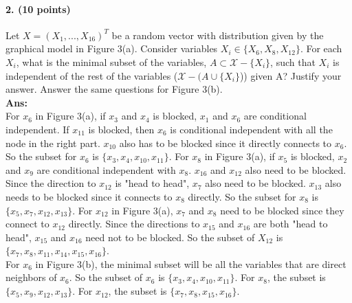 \documentclass[11pt]{article}
\begin{document}
\paragraph{2. (10 points)} Let $X = (X_1, . . . , X_{16})^T$ be a random vector with distribution given by the graphical model in Figure 3(a). Consider variables $X_i \in \{ X_{6}, X_{8}, X_{12} \}$.  For each $X_{i}$, what is the minimal subset of the variables, $A\subset \mathcal{X} -\{X_{i}\}$, such that $X_{i}$ is independent of the rest of the variables ($\mathcal{X} - (A\cup{\{ X_{i}\}}$)) given A? Justify your answer.  Answer the same questions for Figure 3(b).\\
\textbf{Ans:}\\
For $x_6$ in Figure 3(a), if $x_3$ and $x_4$ is blocked, $x_1$ and $x_6$ are conditional independent. If $x_{11}$ is blocked, then $x_6$ is conditional independent with all the node in the right part. $x_{10}$ also has to be blocked since it directly connects to $x_6$. So the subset for $x_6$ is $\{x_3, x_4, x_{10}, x_{11}\}$. 
For $x_8$ in Figure 3(a), if $x_5$ is blocked, $x_2$ and $x_9$ are conditional independent with $x_8$. $x_{16}$ and $x_{12}$ also need to be blocked. Since the direction to $x_{12}$ is "head to head", $x_7$ also need to be blocked. $x_{13}$ also needs to be blocked since it connects to $x_8$ directly. So the subset for $x_8$ is $\{x_5, x_7, x_{12}, x_{13}\}$.
For $x_{12}$ in Figure 3(a), $x_7$ and $x_8$ need to be blocked since they connect to $x_{12}$ directly. Since the directions to $x_{15}$ and $x_{16}$ are both "head to head", $x_{15}$ and $x_{16}$ need not to be blocked. So the subset of $X_{12}$ is $\{x_7, x_8, x_{11}, x_{14}, x_{15}, x_{16}\}$.\\

For $x_6$ in Figure 3(b), the minimal subset will be all the variables that are direct neighbors of $x_6$. So the subset of $x_6$ is $\{x_3, x_4, x_{10}, x_{11}\}$. For $x_8$, the subset is $\{x_5, x_9, x_{12}, x_{13}\}$. For $x_{12}$, the subset is $\{x_7, x_8, x_{15}, x_{16}\}$.
\end{document}

